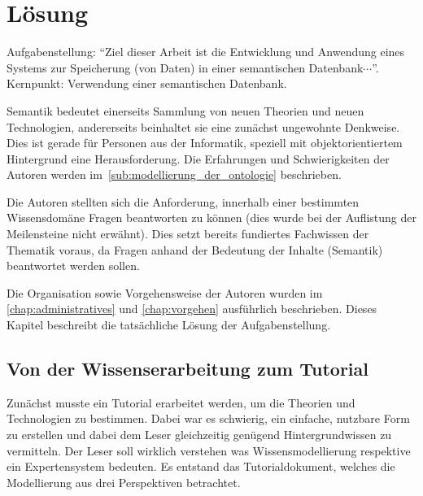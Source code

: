\chapter{Lösung}
\label{chap:loesung}
Aufgabenstellung: ``Ziel dieser Arbeit ist die Entwicklung und Anwendung eines Systems zur Speicherung (von Daten) in einer semantischen Datenbank$\cdots$''.~\cite{Aufgabenstellung} Kernpunkt: Verwendung einer semantischen Datenbank.

Semantik bedeutet einerseits Sammlung von neuen Theorien und neuen Technologien, andererseits beinhaltet sie eine zunächst ungewohnte Denkweise. Dies ist gerade für Personen aus der Informatik, speziell mit objektorientiertem Hintergrund eine Herausforderung. Die Erfahrungen und Schwierigkeiten der Autoren werden im~\autoref{sub:modellierung_der_ontologie} beschrieben.

Die Autoren stellten sich die  Anforderung, innerhalb einer bestimmten Wissensdomäne Fragen beantworten zu können (dies wurde bei der Auflistung der Meilensteine nicht erwähnt). Dies setzt bereits fundiertes Fachwissen der Thematik voraus, da Fragen anhand der Bedeutung der Inhalte (Semantik) beantwortet werden sollen.

Die Organisation sowie Vorgehensweise der Autoren wurden im \autoref{chap:administratives} und \autoref{chap:vorgehen} ausführlich beschrieben. Dieses Kapitel beschreibt die tatsächliche Lösung der Aufgabenstellung.

\section{Von der Wissenserarbeitung zum Tutorial}
\label{sec:loesung_tutorial}
Zunächst musste ein Tutorial erarbeitet werden, um die Theorien und Technologien zu bestimmen. Dabei war es schwierig, ein einfache, nutzbare Form zu erstellen und dabei dem Leser gleichzeitig genügend Hintergrundwissen zu vermitteln. Der Leser soll wirklich verstehen was Wissensmodellierung respektive ein Expertensystem bedeuten. Es entstand das Tutorialdokument, welches die Modellierung aus drei Perspektiven betrachtet. %

